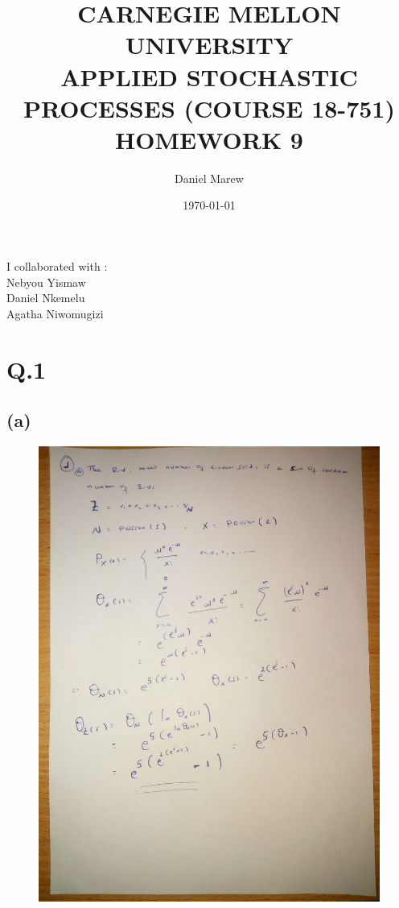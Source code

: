 \documentclass[a4paper,11pt]{article}
\begin{document}
\title{\color{red}CARNEGIE MELLON UNIVERSITY\\
APPLIED STOCHASTIC PROCESSES  (COURSE 18-751)\\
HOMEWORK 9}
\author{Daniel Marew}
\date{\today}
\clearpage\maketitle

\thispagestyle{empty}
\newpage
I collaborated with :\\
\hspace*{6cm}
Nebyou Yismaw\\
\hspace*{6cm}
Daniel    Nkemelu\\
\hspace*{6cm}
Agatha Niwomugizi
\thispagestyle{empty}
\newpage
\clearpage

\setcounter{page}{1}
\section*{Q.1}
\subsection*{(a)}

\begin{figure}[h]
\centering
   \includegraphics[scale=0.45]{q1_a}
\end{figure}
\clearpage
\newpage
\end{document}
